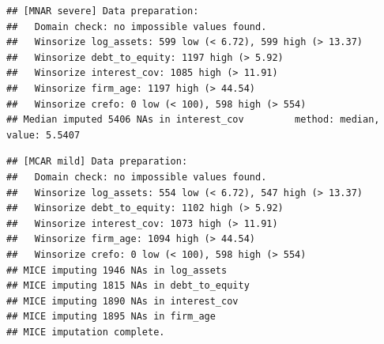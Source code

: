 \documentclass[
]{article}
\newenvironment{Shaded}{\begin{snugshade}}{\end{snugshade}}
\newcommand{\AttributeTok}[1]{\textcolor[rgb]{0.13,0.29,0.53}{#1}}
\newcommand{\CommentTok}[1]{\textcolor[rgb]{0.56,0.35,0.01}{\textit{#1}}}
\newcommand{\FunctionTok}[1]{\textcolor[rgb]{0.13,0.29,0.53}{\textbf{#1}}}
\newcommand{\NormalTok}[1]{#1}
\newcommand{\OtherTok}[1]{\textcolor[rgb]{0.56,0.35,0.01}{#1}}
\newcommand{\SpecialCharTok}[1]{\textcolor[rgb]{0.81,0.36,0.00}{\textbf{#1}}}
\newcommand{\StringTok}[1]{\textcolor[rgb]{0.31,0.60,0.02}{#1}}
\begin{document}
\begin{Shaded}
\end{Shaded}

\begin{verbatim}
## [MNAR severe] Data preparation:
##   Domain check: no impossible values found.
##   Winsorize log_assets: 599 low (< 6.72), 599 high (> 13.37)
##   Winsorize debt_to_equity: 1197 high (> 5.92)
##   Winsorize interest_cov: 1085 high (> 11.91)
##   Winsorize firm_age: 1197 high (> 44.54)
##   Winsorize crefo: 0 low (< 100), 598 high (> 554)
## Median imputed 5406 NAs in interest_cov         method: median, value: 5.5407
\end{verbatim}

\begin{Shaded}
\end{Shaded}

\begin{verbatim}
## [MCAR mild] Data preparation:
##   Domain check: no impossible values found.
##   Winsorize log_assets: 554 low (< 6.72), 547 high (> 13.37)
##   Winsorize debt_to_equity: 1102 high (> 5.92)
##   Winsorize interest_cov: 1073 high (> 11.91)
##   Winsorize firm_age: 1094 high (> 44.54)
##   Winsorize crefo: 0 low (< 100), 598 high (> 554)
## MICE imputing 1946 NAs in log_assets
## MICE imputing 1815 NAs in debt_to_equity
## MICE imputing 1890 NAs in interest_cov
## MICE imputing 1895 NAs in firm_age
## MICE imputation complete.
\end{verbatim}

\begin{Shaded}
\end{Shaded}
\end{document}
